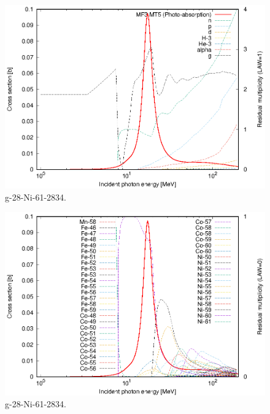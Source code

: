 \begin{figure}
 \includegraphics[width=\linewidth]{eps/g_28-Ni-61_2834.eps}
  \caption{g-28-Ni-61-2834.}
\end{figure}
\begin{figure}
 \includegraphics[width=\linewidth]{eps-law0/g_28-Ni-61_2834.eps}
 \caption{g-28-Ni-61-2834.}
\end{figure}
\newpage \clearpage

